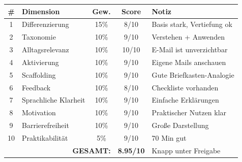 \documentclass[11pt,a4paper]{article}
\begin{document}
\begin{scorebox}
\begin{tabular}{|c|l|c|c|p{3.5cm}|}
\hline
\# & Dimension & Gew. & Score & Notiz \\
\hline
1 & Differenzierung & 15\% & 8/10 & Basis stark, Vertiefung ok \\
2 & Taxonomie & 10\% & 9/10 & Verstehen + Anwenden \\
3 & Alltagsrelevanz & 10\% & 10/10 & E-Mail ist unverzichtbar \\
4 & Aktivierung & 10\% & 9/10 & Eigene Mails anschauen \\
5 & Scaffolding & 10\% & 9/10 & Gute Briefkasten-Analogie \\
6 & Feedback & 10\% & 8/10 & Checkliste vorhanden \\
7 & Sprachliche Klarheit & 10\% & 9/10 & Einfache Erklärungen \\
8 & Motivation & 10\% & 9/10 & Praktischer Nutzen klar \\
9 & Barrierefreiheit & 10\% & 9/10 & Große Darstellung \\
10 & Praktikabilität & 5\% & 9/10 & 70 Min gut \\
\hline
\multicolumn{3}{|r|}{\textbf{GESAMT:}} & \textbf{8.95/10} & Knapp unter Freigabe \\
\hline
\end{tabular}
\end{scorebox}
\end{document}
